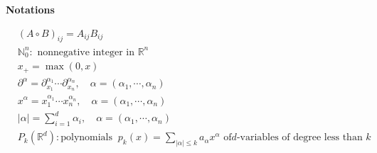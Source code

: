 \newpage

\vspace{1cm}
\begin{center}
\Large{\textbf {Notations}}
\end{center}

\vspace{1cm}
$$
\begin{aligned}
 &(A\circ B)_{ij}=A_{ij}B_{ij}
 \\
& \mathbb{N}_{0}^{n}: \mbox{ nonnegative integer in }
\mathbb{R}^n
\\
& x_+=\max (0, x)
\\
&\partial^\alpha = \partial_{x_1}^{\alpha_1}\cdots\partial_{x_n}^{\alpha_n},\quad \alpha=(\alpha_1,\cdots, \alpha_n)
\\
&x^\alpha = x_1^{\alpha_1}\cdots x_n^{\alpha_n},\quad \alpha=(\alpha_1,\cdots, \alpha_n)
\\
&|\alpha| = \sum_{i=1}^d \alpha_i,\quad \alpha=(\alpha_1,\cdots, \alpha_n)
\\
&P_k(\mathbb{R}^d): \mbox{polynomials }\ p_k(x)=\sum_{|\alpha|\le k}
a_{\alpha} x^\alpha \mbox{ of
$d$-variables of degree less than $k$} 
\end{aligned}
$$
